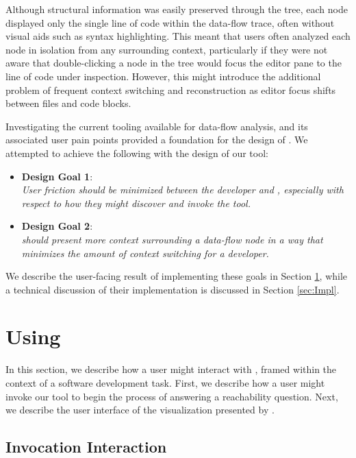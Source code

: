\par Although structural information was easily preserved through the tree, each node
displayed only the single line of code within the data-flow trace, often
without visual aids such as syntax highlighting.
This meant that users often analyzed each node in isolation from any surrounding
context, particularly if they were not aware that double-clicking a node in the
tree would focus the editor pane to the line of code under inspection.
However, this might introduce the additional problem of frequent context
switching and reconstruction as editor focus shifts between files and code
blocks.

\par Investigating the current tooling available for data-flow analysis, and
its associated user pain points provided a foundation for the design of 
\toolname{}.
We attempted to achieve the following with the design of our tool:

\begin{itemize}
  \item[] \textbf{Design Goal 1}: \\
    \textit{
      User friction should be minimized between the developer and \toolname{},
      especially with respect to how they might discover and invoke the tool.
    }
  \item[] \textbf{Design Goal 2}: \\
  \textit{
    \toolname{} should present more context surrounding a data-flow node in
      a way that minimizes the amount of context switching for a developer.
  }
\end{itemize}

We describe the user-facing result of implementing these goals in Section
\ref{sec:UsingReachHover}, while a technical discussion of their implementation 
is discussed in Section \ref{sec:Impl}.

\section{Using \toolname{}}
\label{sec:UsingReachHover}

In this section, we describe how a user might interact with \toolname{}, framed
within the context of a software development task.
First, we describe how a user might invoke our tool to begin the process
of answering a reachability question.
Next, we describe the user interface of the visualization presented by 
\toolname{}.

\subsection{Invocation Interaction}
\label{subsection:InvocationInteraction}

